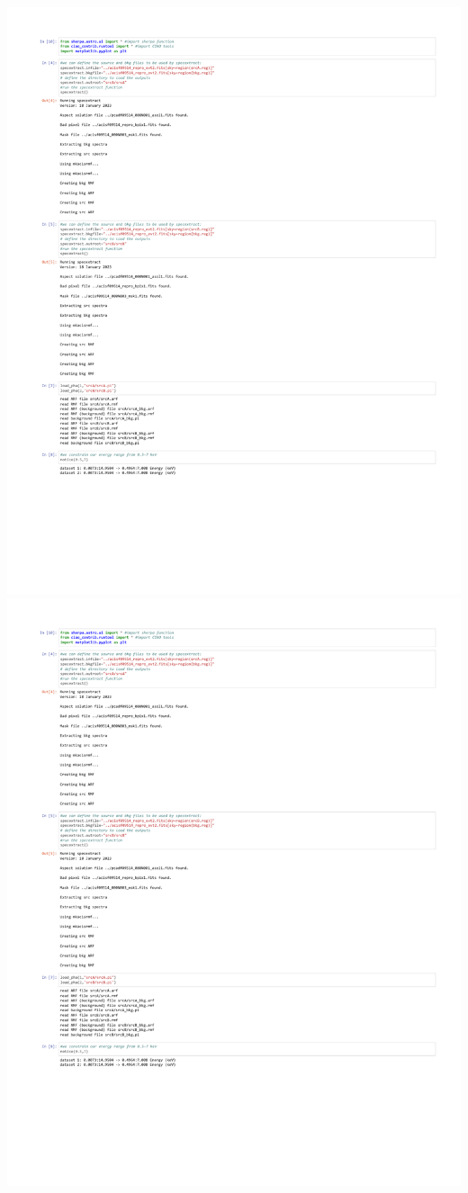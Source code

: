 \documentclass[12pt]{report}
\begin{document}
\includegraphics[scale=0.75,page=3]{Images/blake_src1.pdf}
\includegraphics[scale=0.75,page=4]{Images/blake_src1.pdf}
\end{document}
